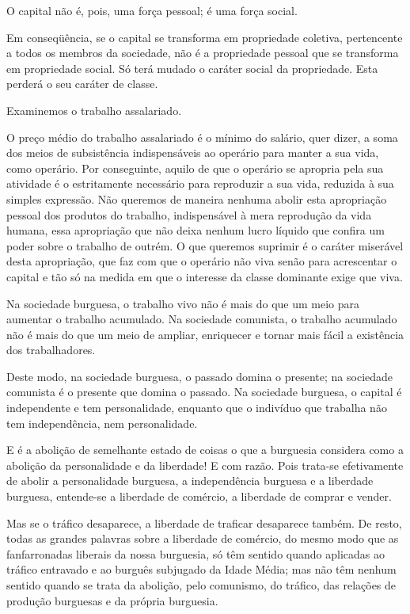 O capital não é, pois, uma força pessoal; é uma força social.

Em conseqüência, se o capital se transforma em propriedade coletiva,
pertencente a todos os membros da sociedade, não é a propriedade
pessoal que se transforma em propriedade social. Só terá mudado o
caráter social da propriedade. Esta perderá o seu caráter de classe.

Examinemos o trabalho assalariado.

O preço médio do trabalho assalariado é o mínimo do salário, quer
dizer, a soma dos meios de subsistência indispensáveis ao operário
para manter a sua vida, como operário. Por conseguinte, aquilo de que
o operário se apropria pela sua atividade é o estritamente necessário
para reproduzir a sua vida, reduzida à sua simples expressão. Não
queremos de maneira nenhuma abolir esta apropriação pessoal dos
produtos do trabalho, indispensável à mera reprodução da vida humana,
essa apropriação que não deixa nenhum lucro líquido que confira um
poder sobre o trabalho de outrém. O que queremos suprimir é o caráter
miserável desta apropriação, que faz com que o operário não viva senão
para acrescentar o capital e tão só na medida em que o interesse da
classe dominante exige que viva.

Na sociedade burguesa, o trabalho vivo não é mais do que um meio para
aumentar o trabalho acumulado. Na sociedade comunista, o trabalho
acumulado não é mais do que um meio de ampliar, enriquecer e tornar
mais fácil a existência dos trabalhadores.

Deste modo, na sociedade burguesa, o passado domina o presente; na
sociedade comunista é o presente que domina o passado. Na sociedade
burguesa, o capital é independente e tem personalidade, enquanto que o
indivíduo que trabalha não tem independência, nem personalidade.

E é a abolição de semelhante estado de coisas o que a burguesia
considera como a abolição da personalidade e da liberdade! E com
razão. Pois trata-se efetivamente de abolir a personalidade burguesa,
a independência burguesa e a liberdade burguesa, entende-se a
liberdade de comércio, a liberdade de comprar e vender.

Mas se o tráfico desaparece, a liberdade de traficar desaparece
também. De resto, todas as grandes palavras sobre a liberdade de
comércio, do mesmo modo que as fanfarronadas liberais da nossa
burguesia, só têm sentido quando aplicadas ao tráfico entravado e ao
burguês subjugado da Idade Média; mas não têm nenhum sentido quando se
trata da abolição, pelo comunismo, do tráfico, das relações de
produção burguesas e da própria burguesia.

